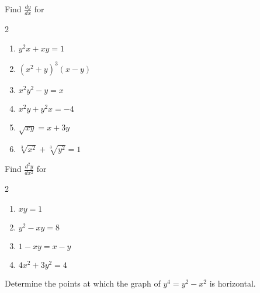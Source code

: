 \documentclass[12pt,letterpaper]{article}
\newenvironment{problem}[2][Problem]{\begin{trivlist}
\item[\hskip \labelsep {\bfseries #1}\hskip \labelsep {\bfseries #2.}]}{\end{trivlist}}
\newenvironment{sol}
    {\emph{Solution:}
    }
    {
    \qed
    }
\begin{document}



\begin{problem}{1}
Find $\displaystyle \frac{dy}{dx}$ for
\begin{multicols}{2}
  \begin{enumerate}[label=\roman*)]
  \item $y^2x+xy=1$
  \item $(x^2+y)^3(x-y)$
  \item $x^2y^2-y=x$
  \item $x^2y+y^2x=-4$
  \item $\sqrt{xy} = x + 3y$
  \item $\displaystyle\sqrt[3]{x^2} + \sqrt[3]{y^2} = 1$
    
  \end{enumerate}
\end{multicols}
\end{problem}

\begin{problem}{2}
Find $\displaystyle \frac{d^2y}{dx^2}$ for
\begin{multicols}{2}
  \begin{enumerate}[label=\roman*)]
  \item $xy = 1$
  \item $y^2 - xy = 8$
  \item $1-xy = x-y$
  \item $4x^2+3y^2=4$
  \end{enumerate}
\end{multicols}
\end{problem}

\begin{problem}{3}
Determine the points at which the graph of $y^4=y^2-x^2$ is horizontal.
\end{problem}





\end{document}
